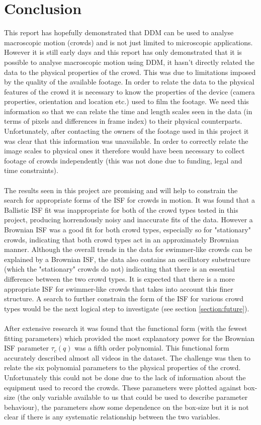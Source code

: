 \documentclass[10pt]{article}
\begin{document}
\section{Conclusion}
\label{section:conclusion}
This report has hopefully demonstrated that DDM can be used to analyse macroscopic motion (crowds) and is not just limited to microscopic applications. However it is still early days and this report has only demonstrated that it is possible to analyse macroscopic motion using DDM, it hasn't directly related the data to the physical properties of the crowd. This was due to limitations imposed by the quality of the available footage. In order to relate the data to the physical features of the crowd it is necessary to know the properties of the device (camera properties, orientation and location etc.) used to film the footage. We need this information so that we can relate the time and length scales seen in the data (in terms of pixels and differences in frame index) to their physical counterparts. Unfortunately, after contacting the owners of the footage used in this project it was clear that this information was unavailable. In order to correctly relate the image scales to physical ones it therefore would have been necessary to collect footage of crowds independently (this was not done due to funding, legal and time constraints).
\\\\
The results seen in this project are promising and will help to constrain the search for appropriate forms of the ISF for crowds in motion. It was found that a Ballistic ISF fit was inappropriate for both of the crowd types tested in this project, producing horrendously noisy and inaccurate fits of the data. However a Brownian ISF was a good fit for both crowd types, especially so for "stationary" crowds, indicating that both crowd types act in an approximately Brownian manner. Although the overall trends in the data for swimmer-like crowds can be explained by a Brownian ISF, the data also contains an oscillatory substructure (which the "stationary" crowds do not) indicating that there is an essential difference between the two crowd types. It is expected that there is a more appropriate ISF for swimmer-like crowds that takes into account this finer structure. A search to further constrain the form of the ISF for various crowd types would be the next logical step to investigate (see section \ref{section:future}).
\\\\
After extensive research it was found that the functional form (with the fewest fitting parameters) which provided the most explanatory power for the Brownian ISF parameter $\tau_c(q)$ was a fifth order polynomial. This functional form accurately described almost all videos in the dataset. The challenge was then to relate the six polynomial parameters to the physical properties of the crowd. Unfortunately this could not be done due to the lack of information about the equipment used to record the crowds. These parameters were plotted against box-size (the only variable available to us that could be used to describe parameter behaviour), the parameters show some dependence on the box-size but it is not clear if there is any systematic relationship between the two variables.
\end{document}
